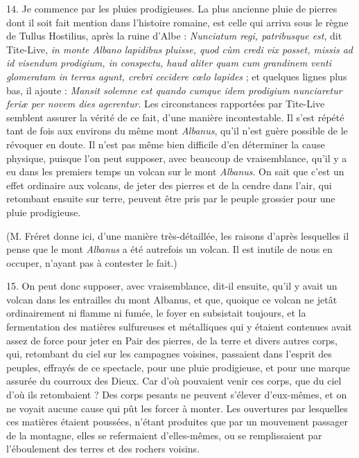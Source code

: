\documentclass[a4paper, 11pt, oneside, polutonikogreek, french]{article}
\begin{document}
14. Je commence par les pluies prodigieuses. La plus ancienne pluie de pierres dont il soit fait mention dans l'histoire romaine, est celle qui arriva sous le règne de Tullus Hostilius, après la ruine d'Albe : \emph{Nunciatum regi, patribusque est}, dit Tite-Live, \emph{in monte Albano lapidibus pluisse, quod cùm credi vix posset, missis ad id visendum prodigium, in conspectu, haud aliter quam cum grandinem venti glomeratam in terras agunt, crebri cecidere cœlo lapides} ; et quelques lignes plus bas, il ajoute : \emph{Mansit solemne est quando cumque idem prodigium nunciaretur feriæ per novem dies agerentur}. Les circonstances rapportées par Tite-Live semblent assurer la vérité de ce fait, d'une manière incontestable. Il s'est répété tant de fois aux environs du même mont \emph{Albanus}, qu'il n'est guère possible de le révoquer en doute. Il n'est pas même bien difficile d'en déterminer la cause physique, puisque l'on peut supposer, avec beaucoup de vraisemblance, qu'il y a eu dans les premiers temps un volcan sur le mont \emph{Albanus}. On sait que c'est un effet ordinaire aux volcans, de jeter des pierres et de la cendre dans l'air, qui retombant ensuite sur terre, peuvent être pris par le peuple grossier pour une pluie prodigieuse.

(M. Fréret donne ici, d'une manière très-détaillée, les raisons d'après lesquelles il pense que le mont \emph{Albanus} a été autrefois un volcan. Il est inutile de nous en occuper, n'ayant pas à contester le fait.)

15. On peut donc supposer, avec vraisemblance, dit-il ensuite, qu'il y avait un volcan dans les entrailles du mont Albanus, et que, quoique ce volcan ne jetât ordinairement ni flamme ni fumée, le foyer en subsistait toujours, et la fermentation des matières sulfureuses et métalliques qui y étaient contenues avait assez de force pour jeter en Pair des pierres, de la terre et divers autres corps, qui, retombant du ciel sur les campagnes voisines, passaient dans l'esprit des peuples, effrayés de ce spectacle, pour une pluie prodigieuse, et pour une marque assurée du courroux des Dieux. Car d'où pouvaient venir ces corps, que du ciel d'où ils retombaient ? Des corps pesants ne peuvent s'élever d'eux-mêmes, et on ne voyait aucune cause qui pût les forcer à monter. Les ouvertures par lesquelles ces matières étaient poussées, n'étant produites que par un mouvement passager de la montagne, elles se refermaient d'elles-mêmes, ou se remplissaient par l'éboulement des terres et des rochers voisins.
\end{document}
